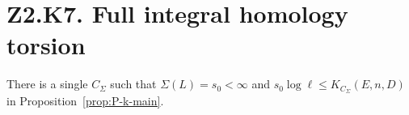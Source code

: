 \section*{Z2.K7. Full integral homology torsion}

\begin{proposition}\label{prop:P-k-num}
There is a single $C_\Sigma$ such that $\Sigma(L)=s_0<\infty$ and
$s_0\log\ell\le K_{C_\Sigma}(E,n,D)$ in Proposition~\ref{prop:P-k-main}.
\end{proposition}
